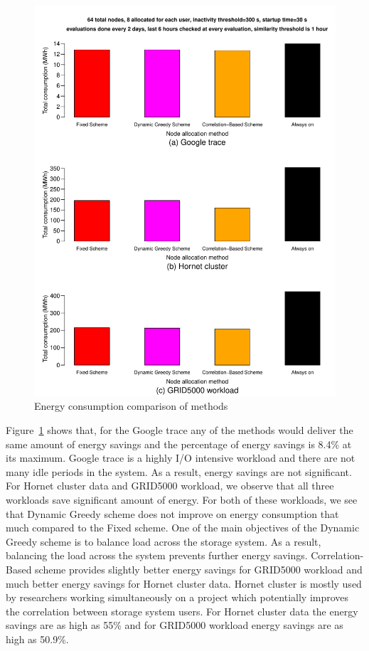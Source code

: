 \documentclass[preprint,12pt]{elsarticle}
\begin{document}
\begin{figure}[!htbp]
\centering
\includegraphics[width=\columnwidth,keepaspectratio]{FIG5.pdf}
\caption{Energy consumption comparison of methods}
\label{bigresult}
\end{figure}

Figure~\ref{bigresult} shows that, for the Google trace any of the methods would deliver the same amount
of energy savings and the percentage of energy savings is 8.4\% at its maximum. Google trace is a highly
I/O intensive workload and there are not many idle periods in the system. As a result, energy savings are
not significant. For Hornet cluster data and GRID5000 workload, we observe that all three workloads save
significant amount of energy. For both of these workloads, we see that Dynamic Greedy scheme does not
improve on energy consumption that much compared to the Fixed scheme. One of the main objectives of the
Dynamic Greedy scheme is to balance load across the storage system. As a result, balancing the load
across the system prevents further energy savings. Correlation-Based scheme provides slightly better energy
savings for GRID5000 workload and much better energy savings for Hornet cluster data. Hornet cluster is mostly
used by researchers working simultaneously on a project which potentially improves the correlation
between storage system users. For Hornet cluster data the energy savings are as high as 55\% and
for GRID5000 workload energy savings are as high as 50.9\%.
\end{document}

